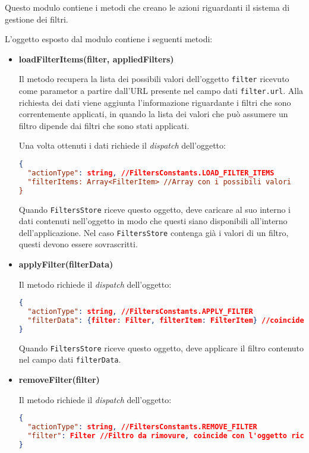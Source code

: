 
Questo modulo contiene i metodi che creano le azioni riguardanti il sistema di gestione dei filtri.

L'oggetto esposto dal modulo contiene i seguenti metodi:
\begin{itemize}
\item \textbf{loadFilterItems(filter, appliedFilters)}

Il metodo recupera la lista dei possibili valori dell'oggetto \texttt{filter} ricevuto come parametor a partire dall'URL presente nel campo dati \texttt{filter.url}. 
Alla richiesta dei dati viene aggiunta l'informazione riguardante i filtri che sono correntemente applicati, in quando la lista dei valori che può assumere un filtro dipende dai filtri che sono stati applicati.

Una volta ottenuti i dati richiede il \textit{dispatch} dell'oggetto:
\begin{lstlisting}[language=JSON, caption=Action - load filter items]
{
  "actionType": string, //FiltersConstants.LOAD_FILTER_ITEMS
  "filterItems: Array<FilterItem> //Array con i possibili valori
}
\end{lstlisting}

Quando \texttt{FiltersStore} riceve questo oggetto, deve caricare al suo interno i dati contenuti nell'oggetto in modo che questi siano disponibili all'interno dell'applicazione. Nel caso \texttt{FiltersStore} contenga già i valori di un filtro, questi devono essere sovrascritti.

\item \textbf{applyFilter(filterData)}

Il metodo richiede il \textit{dispatch} dell'oggetto:
\begin{lstlisting}[language=JSON, caption=Action - apply filter]
{
  "actionType": string, //FiltersConstants.APPLY_FILTER
  "filterData": {filter: Filter, filterItem: FilterItem} //coincide con l'oggetto ricevuto come parametro
}
\end{lstlisting}

Quando \texttt{FiltersStore} riceve questo oggetto, deve applicare il filtro contenuto nel campo dati \texttt{filterData}.

\item \textbf{removeFilter(filter)}

Il metodo richiede il \textit{dispatch} dell'oggetto:
\begin{lstlisting}[language=JSON, caption=Action - remove filter]
{
  "actionType": string, //FiltersConstants.REMOVE_FILTER
  "filter": Filter //Filtro da rimovure, coincide con l'oggetto ricevuto come parametro
}
\end{lstlisting}


\end{itemize}
